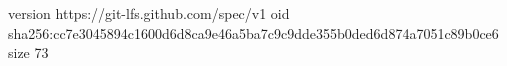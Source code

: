 version https://git-lfs.github.com/spec/v1
oid sha256:cc7e3045894c1600d6d8ca9e46a5ba7c9c9dde355b0ded6d874a7051c89b0ce6
size 73
